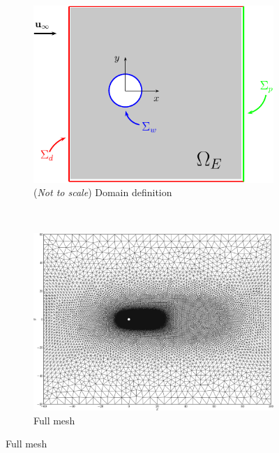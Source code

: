 	\begin{figure}[!p]
     \centering
     \begin{subfigure}[t]{0.45\textwidth}
             \includegraphics[width=\textwidth]{figures/eulerian/ISCDomainDefinition-crop.pdf}
             \caption{(\textit{Not to scale}) Domain definition}
             \label{fig:ISCDomainDefinition-crop}
     \end{subfigure}%
     ~ %
     \begin{subfigure}[t]{0.45\textwidth}
             \includegraphics[width=\textwidth]{figures/eulerian/ISC_mesh-crop.png}
             \caption{Full mesh}
             \label{fig:ISC_mesh}
     \end{subfigure}


\end{figure}
